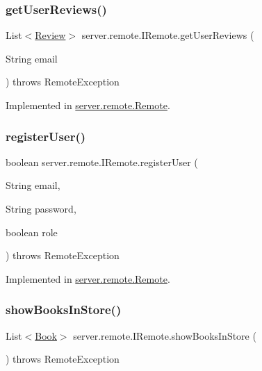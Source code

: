 \subsubsection{\texorpdfstring{get\+User\+Reviews()}{getUserReviews()}}
{\footnotesize\ttfamily List$<$\hyperlink{classserver_1_1data_1_1_review}{Review}$>$ server.\+remote.\+I\+Remote.\+get\+User\+Reviews (\begin{DoxyParamCaption}\item[{String}]{email }\end{DoxyParamCaption}) throws Remote\+Exception}



Implemented in \hyperlink{classserver_1_1remote_1_1_remote_a396c96a6b8802c2b4658ecccd37e84db}{server.\+remote.\+Remote}.

\mbox{\label{interfaceserver_1_1remote_1_1_i_remote_a2e426f5eb58352993207ce0a24539f81}} 
\subsubsection{\texorpdfstring{register\+User()}{registerUser()}}
{\footnotesize\ttfamily boolean server.\+remote.\+I\+Remote.\+register\+User (\begin{DoxyParamCaption}\item[{String}]{email,  }\item[{String}]{password,  }\item[{boolean}]{role }\end{DoxyParamCaption}) throws Remote\+Exception}



Implemented in \hyperlink{classserver_1_1remote_1_1_remote_ad3a381123e93a8e5ec26d84c4ff8b92f}{server.\+remote.\+Remote}.

\mbox{\label{interfaceserver_1_1remote_1_1_i_remote_ac8a764235c51eff20d635f40707e377e}} 
\subsubsection{\texorpdfstring{show\+Books\+In\+Store()}{showBooksInStore()}}
{\footnotesize\ttfamily List$<$\hyperlink{classserver_1_1data_1_1_book}{Book}$>$ server.\+remote.\+I\+Remote.\+show\+Books\+In\+Store (\begin{DoxyParamCaption}{ }\end{DoxyParamCaption}) throws Remote\+Exception}



